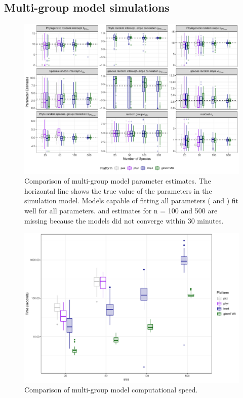 \documentclass[12pt]{article}
\begin{document}
\subsection*{Multi-group model simulations}

\begin{center}
\begin{figure}[H]
  \includegraphics[scale=0.7]{./figure/msplot.pdf}
  \caption{Comparison of multi-group model parameter estimates. The horizontal line shows the true value of the parameters in the simulation model. Models capable of fitting all parameters ( and ) fit well for all parameters.  and  estimates for n = 100 and 500 are missing because the models did not converge within 30 minutes.
  }
  \label{msplot}
\end{figure}
\end{center}
\begin{center}
\begin{figure}[H]
  \includegraphics[scale=0.7]{./figure/mstime.pdf}
  \caption{Comparison of multi-group model computational speed.}
  \label{msplot_time}
\end{figure}
\end{center}
\end{document}
